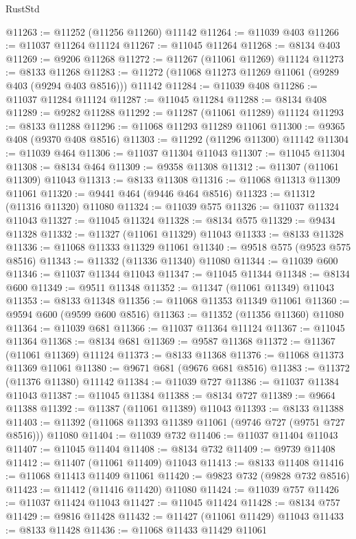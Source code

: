 \begin{lexlean}{RustStd}
\begin{coremodule}
@11263 := @11252 (@11256 @11260) @11142
@11264 := @11039 @403
@11266 := @11037 @11264 @11124
@11267 := @11045 @11264
@11268 := @8134 @403
@11269 := @9206 @11268
@11272 := @11267 (@11061 @11269) @11124
@11273 := @8133 @11268
@11283 := @11272 (@11068 @11273 @11269 @11061 (@9289 @403 (@9294 @403 @8516))) @11142
@11284 := @11039 @408
@11286 := @11037 @11284 @11124
@11287 := @11045 @11284
@11288 := @8134 @408
@11289 := @9282 @11288
@11292 := @11287 (@11061 @11289) @11124
@11293 := @8133 @11288
@11296 := @11068 @11293 @11289 @11061
@11300 := @9365 @408 (@9370 @408 @8516)
@11303 := @11292 (@11296 @11300) @11142
@11304 := @11039 @464
@11306 := @11037 @11304 @11043
@11307 := @11045 @11304
@11308 := @8134 @464
@11309 := @9358 @11308
@11312 := @11307 (@11061 @11309) @11043
@11313 := @8133 @11308
@11316 := @11068 @11313 @11309 @11061
@11320 := @9441 @464 (@9446 @464 @8516)
@11323 := @11312 (@11316 @11320) @11080
@11324 := @11039 @575
@11326 := @11037 @11324 @11043
@11327 := @11045 @11324
@11328 := @8134 @575
@11329 := @9434 @11328
@11332 := @11327 (@11061 @11329) @11043
@11333 := @8133 @11328
@11336 := @11068 @11333 @11329 @11061
@11340 := @9518 @575 (@9523 @575 @8516)
@11343 := @11332 (@11336 @11340) @11080
@11344 := @11039 @600
@11346 := @11037 @11344 @11043
@11347 := @11045 @11344
@11348 := @8134 @600
@11349 := @9511 @11348
@11352 := @11347 (@11061 @11349) @11043
@11353 := @8133 @11348
@11356 := @11068 @11353 @11349 @11061
@11360 := @9594 @600 (@9599 @600 @8516)
@11363 := @11352 (@11356 @11360) @11080
@11364 := @11039 @681
@11366 := @11037 @11364 @11124
@11367 := @11045 @11364
@11368 := @8134 @681
@11369 := @9587 @11368
@11372 := @11367 (@11061 @11369) @11124
@11373 := @8133 @11368
@11376 := @11068 @11373 @11369 @11061
@11380 := @9671 @681 (@9676 @681 @8516)
@11383 := @11372 (@11376 @11380) @11142
@11384 := @11039 @727
@11386 := @11037 @11384 @11043
@11387 := @11045 @11384
@11388 := @8134 @727
@11389 := @9664 @11388
@11392 := @11387 (@11061 @11389) @11043
@11393 := @8133 @11388
@11403 := @11392 (@11068 @11393 @11389 @11061 (@9746 @727 (@9751 @727 @8516))) @11080
@11404 := @11039 @732
@11406 := @11037 @11404 @11043
@11407 := @11045 @11404
@11408 := @8134 @732
@11409 := @9739 @11408
@11412 := @11407 (@11061 @11409) @11043
@11413 := @8133 @11408
@11416 := @11068 @11413 @11409 @11061
@11420 := @9823 @732 (@9828 @732 @8516)
@11423 := @11412 (@11416 @11420) @11080
@11424 := @11039 @757
@11426 := @11037 @11424 @11043
@11427 := @11045 @11424
@11428 := @8134 @757
@11429 := @9816 @11428
@11432 := @11427 (@11061 @11429) @11043
@11433 := @8133 @11428
@11436 := @11068 @11433 @11429 @11061

\end{coremodule}
\end{lexlean}
